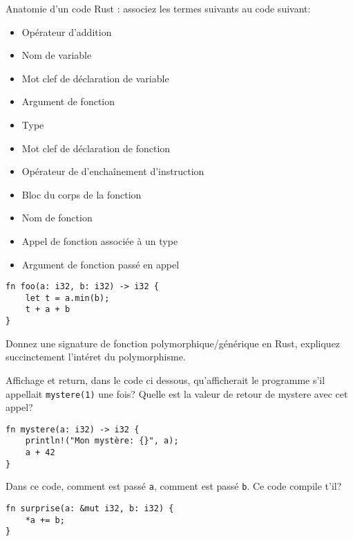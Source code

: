 \documentclass[11pt,a4paper,addpoint]{exam}
\begin{document}
\begin{questions}
\question[1] Anatomie d'un code Rust : associez les termes suivants au code suivant:
\begin{multicols}{2}
\begin{itemize}
    \item Opérateur d'addition
    \item Nom de variable
    \item Mot clef de déclaration de variable
    \item Argument de fonction
    \item Type
    \item Mot clef de déclaration de fonction
    \item Opérateur de d'enchaînement d'instruction
    \item Bloc du corps de la fonction
    \item Nom de fonction
    \item Appel de fonction associée à un type
    \item Argument de fonction passé en appel
\end{itemize}
\end{multicols}
\begin{verbatim}
fn foo(a: i32, b: i32) -> i32 {
    let t = a.min(b);
    t + a + b
}
\end{verbatim}
\vspace{2in}

\question[1] Donnez une signature de fonction polymorphique/générique en Rust, expliquez succinctement l'intéret du polymorphisme.
\vspace{1.5in}

\question[1] Affichage et return, dans le code ci dessous, qu'afficherait le
programme s'il appellait \texttt{mystere(1)} une fois? Quelle est la valeur de retour de mystere avec cet appel?
\begin{verbatim}
fn mystere(a: i32) -> i32 {
    println!("Mon mystère: {}", a);
    a + 42
}
\end{verbatim}
\vspace{1in}

\question[1] Dans ce code, comment est passé \texttt{a}, comment est passé \texttt{b}.
Ce code compile t'il?
\begin{verbatim}
fn surprise(a: &mut i32, b: i32) {
    *a += b;
}
\end{verbatim}
\vspace{1in}


\end{questions}
\end{document}
